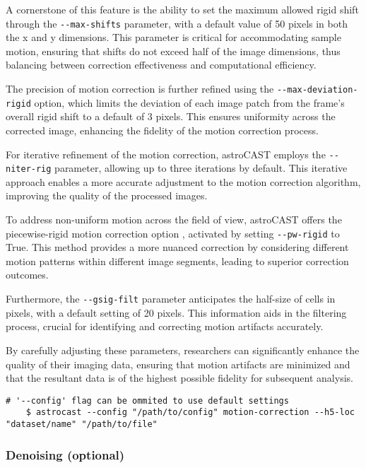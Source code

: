 A cornerstone of this feature is the ability to set the maximum allowed rigid shift through the \lstinline[style=
bashStyle]{--max-shifts} parameter, with a default value of 50 pixels in both the x and y dimensions. This parameter
is critical for accommodating sample motion, ensuring that shifts do not exceed half of the image dimensions, thus
balancing between correction effectiveness and computational efficiency.

The precision of motion correction is further refined using the \lstinline[style=bashStyle]{--max-deviation-rigid}
option, which limits the deviation of each image patch from the frame's overall rigid shift to a default of 3 pixels.
This ensures uniformity across the corrected image, enhancing the fidelity of the motion correction process.

For iterative refinement of the motion correction, astroCAST employs the \lstinline[style=bashStyle]{--niter-rig}
parameter, allowing up to three iterations by default. This iterative approach enables a more accurate adjustment to
the motion correction algorithm, improving the quality of the processed images.

To address non-uniform motion across the field of view, astroCAST offers the piecewise-rigid motion correction option
, activated by setting \lstinline[style=bashStyle]{--pw-rigid} to True. This method provides a more nuanced
correction by considering different motion patterns within different image segments, leading to superior correction
outcomes.

Furthermore, the \lstinline[style=bashStyle]{--gsig-filt} parameter anticipates the half-size of cells in pixels,
with a default setting of 20 pixels. This information aids in the filtering process, crucial for identifying and
correcting motion artifacts accurately.

By carefully adjusting these parameters, researchers can significantly enhance the quality of their imaging data,
ensuring that motion artifacts are minimized and that the resultant data is of the highest possible fidelity for
subsequent analysis.

\begin{lstlisting}[style=bashStyle]
    # '--config' flag can be ommited to use default settings
    $ astrocast --config "/path/to/config" motion-correction --h5-loc "dataset/name" "/path/to/file"
\end{lstlisting}

\subsubsection{Denoising (optional)}

